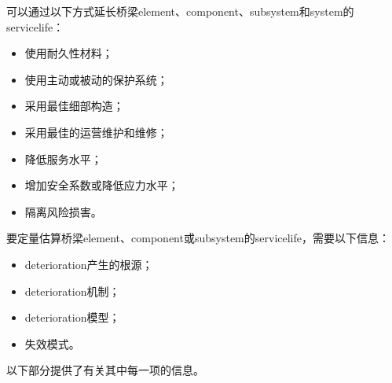 可以通过以下方式延长桥梁\gls*{element}、\gls*{component}、\gls*{subsystem}和\gls*{system}的\gls*{servicelife}：

\begin{itemize}
  \item 使用耐久性材料；
  \item 使用主动或被动的保护系统；
  \item 采用最佳细部构造；
  \item 采用最佳的运营维护和维修；
  \item 降低服务水平；
  \item 增加安全系数或降低应力水平；
  \item 隔离风险损害。
\end{itemize}

要定量估算桥梁\gls*{element}、\gls*{component}或\gls*{subsystem}的\gls*{servicelife}，需要以下信息：
\begin{itemize}
  \item \gls*{deterioration}产生的根源；
  \item \gls*{deterioration}机制；
  \item \gls*{deterioration}模型；
  \item 失效模式。
\end{itemize}

以下部分提供了有关其中每一项的信息。

